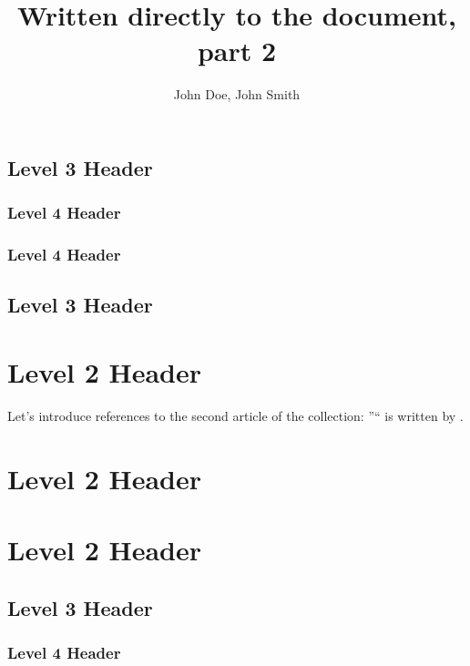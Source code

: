 \documentclass[articlecollection]{aaltoseries}
\begin{document}
\subsection{Level 3 Header}
\lipsum[5]
\subsubsection{Level 4 Header}
\lipsum[6]
\subsubsection{Level 4 Header}
\lipsum[7]
\subsection{Level 3 Header}
\lipsum[8]
\section{Level 2 Header}
\lipsum[9-10]

Let's introduce references to the second article of the collection: ''`` is written by .

\author[John Doe and John Smith]{John Doe, John Smith}
\title{Written directly to the document, part 2}

\maketitle[article2]

\begin{abstract}
\lipsum[1]
\end{abstract}

\section{Level 2 Header}
\lipsum[1-2]
\section{Level 2 Header}
\lipsum[3-4]
\subsection{Level 3 Header}
\lipsum[5]
\subsubsection{Level 4 Header}
\lipsum[6]
\end{document}
